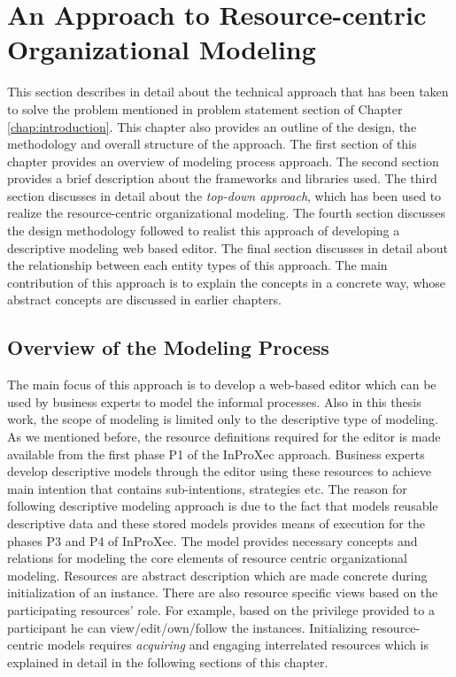 \chapter{An Approach to Resource-centric Organizational Modeling}
\label{chap:approach}
This section describes in detail about the technical approach that has been taken to solve the problem mentioned in problem statement section of Chapter \ref{chap:introduction}. This chapter also provides an outline of the design, the methodology and overall structure of the approach. The first section of this chapter provides an overview of modeling process approach. The second section  provides a brief description about the frameworks and libraries used. The third section discusses in detail about the \textit{top-down approach}, which has been used to realize the resource-centric organizational modeling. The fourth section discusses the design methodology followed to realist this approach of developing a descriptive modeling web based editor. The final section discusses in detail about the relationship between each entity types of this approach. The main contribution of this approach is to explain the concepts in a concrete way, whose abstract concepts are discussed in earlier chapters.

\section{Overview of the Modeling Process}
\label{sec:overviewmodelingprocess}
The main focus of this approach is to develop a web-based editor which can be used by business experts to model the informal processes. Also in this thesis work, the scope of modeling is limited only to the descriptive type of modeling. As we mentioned before, the resource definitions required for the editor is made available from the first phase P1 of the InProXec approach. Business experts develop descriptive models through the editor using these resources to achieve main intention that contains sub-intentions, strategies etc. The reason for following descriptive modeling approach is due to the fact that models reusable descriptive data and these stored models provides means of execution for the phases P3 and P4 of InProXec. The model provides necessary concepts and relations for modeling the core elements of resource centric organizational modeling. Resources are abstract description which are made concrete during initialization of an instance. There are also resource specific views based on the participating resources' role. For example, based on the privilege provided to a participant he can view/edit/own/follow the instances. Initializing resource-centric  models requires \textit{acquiring} and engaging interrelated resources which is explained in detail in the following sections of this chapter. 

